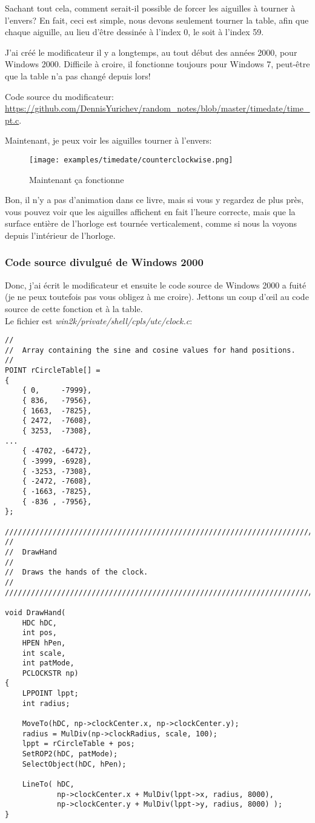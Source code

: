 Sachant tout cela, comment serait-il possible de forcer les aiguilles à tourner à
l'envers?
En fait, ceci est simple, nous devons seulement tourner la table, afin que chaque
aiguille, au lieu d'être dessinée à l'index 0, le soit à l'index 59.

J'ai créé le modificateur il y a longtemps, au tout début des années 2000, pour Windows 2000.
Difficile à croire, il fonctionne toujours pour Windows 7, peut-être que la table
n'a pas changé depuis lors!

Code source du modificateur: \url{https://github.com/DennisYurichev/random_notes/blob/master/timedate/time_pt.c}.

Maintenant, je peux voir les aiguilles tourner à l'envers:

\begin{figure}[H]
\centering
\texttt{[image: examples/timedate/counterclockwise.png]}
\caption{Maintenant ça fonctionne}
\end{figure}

Bon, il n'y a pas d'animation dans ce livre, mais si vous y regardez de plus près,
vous pouvez voir que les aiguilles affichent en fait l'heure correcte, mais que la
surface entière de l'horloge est tournée verticalement, comme si nous la voyons depuis
l'intérieur de l'horloge.

\subsubsection{Code source divulgué de Windows 2000}

Donc, j'ai écrit le modificateur et ensuite le code source de Windows 2000 a fuité
(je ne peux toutefois pas vous obligez à me croire).
Jettons un coup d'\oe{}il au code source de cette fonction et à la table.\\
Le fichier est \emph{win2k/private/shell/cpls/utc/clock.c}:

\begin{lstlisting}[style=customc]
//
//  Array containing the sine and cosine values for hand positions.
//
POINT rCircleTable[] =
{
    { 0,     -7999},
    { 836,   -7956},
    { 1663,  -7825},
    { 2472,  -7608},
    { 3253,  -7308},
...
    { -4702, -6472},
    { -3999, -6928},
    { -3253, -7308},
    { -2472, -7608},
    { -1663, -7825},
    { -836 , -7956},
};

////////////////////////////////////////////////////////////////////////////
//
//  DrawHand
//
//  Draws the hands of the clock.
//
////////////////////////////////////////////////////////////////////////////

void DrawHand(
    HDC hDC,
    int pos,
    HPEN hPen,
    int scale,
    int patMode,
    PCLOCKSTR np)
{
    LPPOINT lppt;
    int radius;

    MoveTo(hDC, np->clockCenter.x, np->clockCenter.y);
    radius = MulDiv(np->clockRadius, scale, 100);
    lppt = rCircleTable + pos;
    SetROP2(hDC, patMode);
    SelectObject(hDC, hPen);

    LineTo( hDC,
            np->clockCenter.x + MulDiv(lppt->x, radius, 8000),
            np->clockCenter.y + MulDiv(lppt->y, radius, 8000) );
}
\end{lstlisting}

